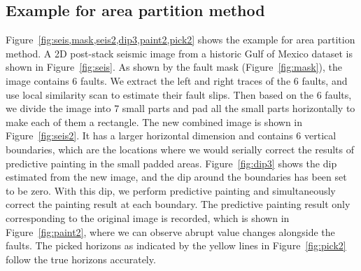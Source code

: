 


\subsection{Example for area partition method}

Figure~\ref{fig:seis,mask,seis2,dip3,paint2,pick2} shows the example for area partition method.
A 2D post-stack seismic image from a historic Gulf of Mexico dataset \cite[]{claerbout06} is shown in Figure~\ref{fig:seis}.
As shown by the fault mask (Figure~\ref{fig:mask}), the image contains 6 faults.
We extract the left and right traces of the 6 faults, and use local similarity scan to estimate their fault slips.
Then based on the 6 faults, we divide the image into 7 small parts and pad all the small parts horizontally to make each of them a rectangle.
The new combined image is shown in Figure~\ref{fig:seis2}.
It has a larger horizontal dimension and contains 6 vertical boundaries, which are the locations where we would serially correct the results of predictive painting in the small padded areas.
Figure~\ref{fig:dip3} shows the dip estimated from the new image, and the dip around the boundaries has been set to be zero.
With this dip, we perform predictive painting and simultaneously correct the painting result at each boundary.
The predictive painting result only corresponding to the original image is recorded, which is shown in Figure~\ref{fig:paint2},
where we can observe abrupt value changes alongside the faults. 
The picked horizons as indicated by the yellow lines in Figure~\ref{fig:pick2} follow the true horizons accurately.

